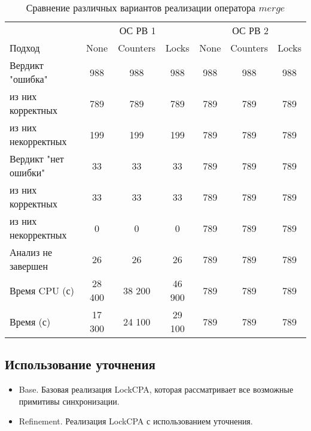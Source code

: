 \begin{center}
  \begin{table}[h]\footnotesize
  	\label{table-drivers-lock-merge}
    \caption{Сравнение различных вариантов реализации оператора $merge$}
    \begin{tabular}{ | l | c | c | c | c | c | c | }
      \hline
      		& 		 \multicolumn{3}{|c|}{ОС РВ 1} 	& 		 \multicolumn{3}{|c|}{ОС РВ 2}	\\
      Подход         				& None 	& Counters 	& Locks & None 	& Counters 	& Locks \\ \hline
      Вердикт "ошибка" 				& 988   & 988       & 988   & 988   & 988       & 988     \\ 
  \hspace{0.5cm} из них корректных 	& 789 	& 789 		& 789   & 789 	& 789 		& 789  \\ 
  \hspace{0.5cm} из них некорректных & 199 	& 199 		& 199   & 789 	& 789 		& 789    \\ \hline
      Вердикт "нет ошибки"  		& 33    & 33        & 33    & 789 	& 789 		& 789  	\\ 
  \hspace{0.5cm} из них корректных 	& 33 	& 33    	& 33    & 789 	& 789 		& 789  	\\
  \hspace{0.5cm} из них некорректных & 0 	& 0    		& 0     & 789 	& 789 		& 789	\\ \hline
      Анализ не завершен       		& 26    & 26        & 26    & 789 	& 789 		& 789	\\ \hline
      Время CPU (с)   				& 28 400 & 38 200   & 46 900 & 789 	& 789 		& 789   \\ 
      Время (с)  					& 17 300 & 24 100   & 29 100 & 789 	& 789 		& 789     \\
      \hline
    \end{tabular}
  \end{table}
\end{center}


\subsection{Использование уточнения}

\begin{itemize}
\item Base. Базовая реализация LockCPA, которая рассматривает все возможные примитивы синхронизации.
\item Refinement. Реализация LockCPA с использованием уточнения.
\end{itemize}

